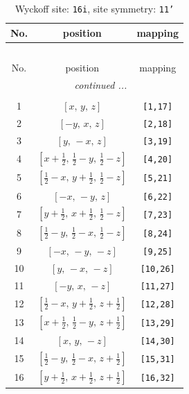 \documentclass[fleqn,8pt]{jsarticle}
\begin{document}
\begin{longtable}{ccc}
\caption{Wyckoff site: {\tt 16i}, site symmetry: {\tt 11'}}
 \\
 \hline \hline
No. & position & mapping \\ \hline \endfirsthead

\multicolumn{2}{l}{\tablename\ \thetable{}} \\
 \hline \hline
No. & position & mapping \\ \hline \endhead

 \hline \hline
\multicolumn{2}{r}{\footnotesize\it continued ...} \\ \endfoot

 \hline \hline
\multicolumn{2}{r}{} \\ \endlastfoot

1 & $\left[ x,\, y,\, z \right]$ & {\tt [1,17]} \\ \hline
2 & $\left[ - y,\, x,\, z \right]$ & {\tt [2,18]} \\ \hline
3 & $\left[ y,\, - x,\, z \right]$ & {\tt [3,19]} \\ \hline
4 & $\left[ x + \frac{1}{2},\, \frac{1}{2} - y,\, \frac{1}{2} - z \right]$ & {\tt [4,20]} \\ \hline
5 & $\left[ \frac{1}{2} - x,\, y + \frac{1}{2},\, \frac{1}{2} - z \right]$ & {\tt [5,21]} \\ \hline
6 & $\left[ - x,\, - y,\, z \right]$ & {\tt [6,22]} \\ \hline
7 & $\left[ y + \frac{1}{2},\, x + \frac{1}{2},\, \frac{1}{2} - z \right]$ & {\tt [7,23]} \\ \hline
8 & $\left[ \frac{1}{2} - y,\, \frac{1}{2} - x,\, \frac{1}{2} - z \right]$ & {\tt [8,24]} \\ \hline
9 & $\left[ - x,\, - y,\, - z \right]$ & {\tt [9,25]} \\ \hline
10 & $\left[ y,\, - x,\, - z \right]$ & {\tt [10,26]} \\ \hline
11 & $\left[ - y,\, x,\, - z \right]$ & {\tt [11,27]} \\ \hline
12 & $\left[ \frac{1}{2} - x,\, y + \frac{1}{2},\, z + \frac{1}{2} \right]$ & {\tt [12,28]} \\ \hline
13 & $\left[ x + \frac{1}{2},\, \frac{1}{2} - y,\, z + \frac{1}{2} \right]$ & {\tt [13,29]} \\ \hline
14 & $\left[ x,\, y,\, - z \right]$ & {\tt [14,30]} \\ \hline
15 & $\left[ \frac{1}{2} - y,\, \frac{1}{2} - x,\, z + \frac{1}{2} \right]$ & {\tt [15,31]} \\ \hline
16 & $\left[ y + \frac{1}{2},\, x + \frac{1}{2},\, z + \frac{1}{2} \right]$ & {\tt [16,32]} \\
\end{longtable}
\end{document}
